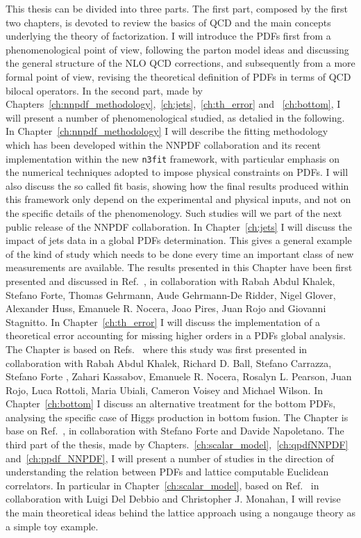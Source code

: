 This thesis can be divided into three parts. The first part, composed by the first two chapters, 
is devoted to review the basics of QCD and the main concepts underlying the theory of factorization. 
I will introduce the PDFs first from a phenomenological point of view, following the parton model ideas and
discussing the general structure of the NLO QCD corrections, and subsequently from a more formal point of view,
revising the theoretical definition of PDFs in terms of QCD bilocal operators.
%
In the second part, made by Chapters~\ref{ch:nnpdf_methodology},~\ref{ch:jets},~\ref{ch:th_error} and ~\ref{ch:bottom}, 
I will present a number of phenomenological studied, as detalied in the following.
%
In Chapter~\ref{ch:nnpdf_methodology} I will describe the fitting methodology which has been developed
within the NNPDF collaboration and its recent implementation within the new {\tt n3fit} framework, 
with particular emphasis on the numerical techniques adopted to impose physical constraints on PDFs.
I will also discuss the so called fit basis, showing how
the final results produced within this framework only depend on the experimental and physical inputs, 
and not on the specific details of the phenomenology. Such studies will we part of the next public release
of the NNPDF collaboration.
%
In Chapter~\ref{ch:jets} I will discuss the impact of jets data in a global PDFs determination. 
This gives a general example of the kind of study which needs to be done every time an important class of new measurements
are available. The results presented in this Chapter have been first presented and discussed in Ref.~\cite{AbdulKhalek:2020jut},
in collaboration with Rabah Abdul Khalek, Stefano Forte, Thomas Gehrmann, Aude Gehrmann-De Ridder,
Nigel Glover, Alexander Huss, Emanuele R. Nocera, Joao Pires, Juan Rojo and Giovanni Stagnitto.
In Chapter~\ref{ch:th_error} I will discuss the implementation of a theoretical error accounting for missing higher orders
in a PDFs global analysis. The Chapter is based on Refs.~\cite{AbdulKhalek:2019bux,AbdulKhalek:2019ihb} where this
study was first presented in collaboration with Rabah Abdul Khalek, Richard D. Ball, Stefano Carrazza, Stefano Forte
, Zahari Kassabov, Emanuele R. Nocera, Rosalyn L. Pearson, Juan Rojo, Luca Rottoli,
Maria Ubiali, Cameron Voisey and Michael Wilson.
In Chapter~\ref{ch:bottom} I discuss an alternative treatment for the bottom PDFs, analysing the specific case of
Higgs production in bottom fusion. The Chapter is base on Ref.~\cite{Forte:2019hjc}, in collaboration with
Stefano Forte and Davide Napoletano.
%
The third part of the thesis, made by Chapters.~\ref{ch:scalar_model},~\ref{ch:qpdfNNPDF} and~\ref{ch:ppdf_NNPDF}, 
I will present a number of studies in the direction of understanding the relation between PDFs and lattice computable
Euclidean correlators.
In particular in Chapter~\ref{ch:scalar_model}, based on Ref.~\cite{DelDebbio:2020cbz}
in collaboration with Luigi Del Debbio and Christopher J. Monahan,
I will revise the main theoretical ideas behind the lattice approach
using a nongauge theory as a simple toy example.




